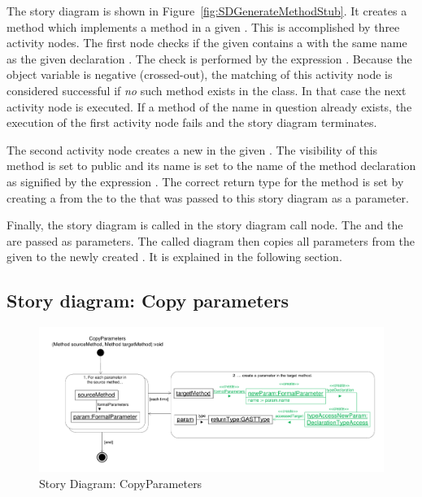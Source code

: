 The story diagram  is shown in Figure~\ref{fig:SDGenerateMethodStub}. It creates a method which implements a method  in a given . This is accomplished by three activity nodes. The first node checks if the given  contains a  with the same name as the given declaration . The check is performed by the expression . Because the object variable  is negative (crossed-out), the matching of this activity node is considered successful if \emph{no} such method exists in the class. In that case the next activity node is executed. If a method of the name in question already exists, the execution of the first activity node fails and the story diagram terminates.

The second activity node creates a new  in the given . The visibility of this method is set to public and its name is set to the name of the method declaration as signified by the expression . The correct return type for the method is set by creating a  from the  to the  that was passed to this story diagram as a parameter.

Finally, the story diagram  is called in the story diagram call node. The  and the  are passed as parameters. The called diagram then copies all parameters from the given  to the newly created . It is explained in the following section.

\subsection{Story diagram: Copy parameters} \label{sec:SDCopyParameters}

\begin{figure}[hbtp]
\centering
\includegraphics[width=0.9\linewidth]{./figures/SDCopyParameters}
\caption{Story Diagram: CopyParameters}
\label{fig:SDCopyParameters}
\end{figure}

